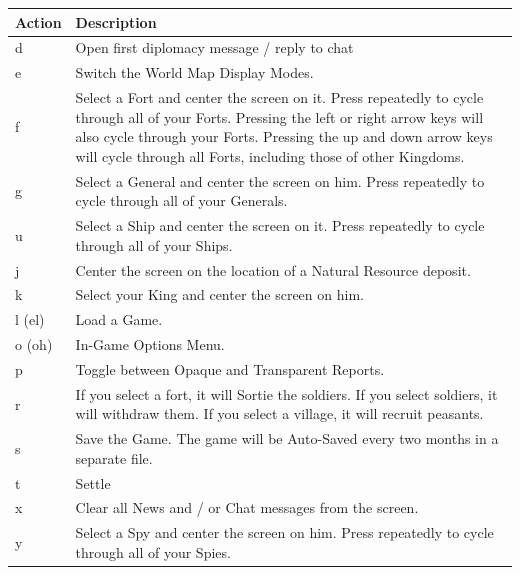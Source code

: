 \begin{center}
	\begin{tabular}{|p{1in}|p{3in}|}
		\hline	 	
		Action	& Description \\ \hline
		d	& Open first diplomacy message / reply to chat \\ \hline
		e	& Switch the World Map Display Modes. \\ \hline
		f	& Select a Fort and center the screen on it. Press repeatedly to cycle through all of your Forts. Pressing the left or right arrow keys will also cycle through your Forts. Pressing the up and down arrow keys will cycle through all Forts, including those of other Kingdoms. \\ \hline
		g	& Select a General and center the screen on him. Press repeatedly to cycle through all of your Generals. \\ \hline
		u	& Select a Ship and center the screen on it. Press repeatedly to cycle through all of your Ships. \\ \hline
		j	& Center the screen on the location of a Natural Resource deposit. \\ \hline
		k	& Select your King and center the screen on him. \\ \hline
		l (el)	& Load a Game. \\ \hline
		o (oh)	& In-Game Options Menu. \\ \hline
		p	& Toggle between Opaque and Transparent Reports. \\ \hline
		r	& If you select a fort, it will Sortie the soldiers. If you select soldiers, it will withdraw them. If you select a village, it will recruit peasants. \\ \hline
		s	& Save the Game. The game will be Auto-Saved every two months in a separate file. \\ \hline
		t	& Settle \\ \hline
		x	& Clear all News and / or Chat messages from the screen. \\ \hline
		y	& Select a Spy and center the screen on him. Press repeatedly to cycle through all of your Spies. \\ \hline
	\end{tabular}
\end{center}	

